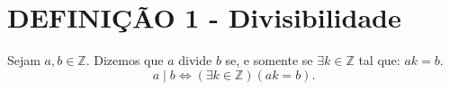 \section{DEFINIÇÃO 1 - Divisibilidade}
Sejam $a, b \in \mathbb{Z}$. Dizemos que $a$ divide $b$ se, e somente se $\exists k \in \mathbb{Z}$ tal que: $ak = b$.
\[
    a \mid b \iff (\exists k \in \mathbb{Z}) (ak = b).
\]